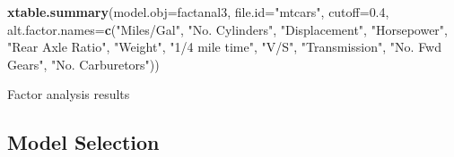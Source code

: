 \documentclass[]{article}
\newenvironment{Shaded}{\begin{snugshade}}{\end{snugshade}}
\newcommand{\KeywordTok}[1]{\textcolor[rgb]{0.13,0.29,0.53}{\textbf{{#1}}}}
\newcommand{\DataTypeTok}[1]{\textcolor[rgb]{0.13,0.29,0.53}{{#1}}}
\newcommand{\FloatTok}[1]{\textcolor[rgb]{0.00,0.00,0.81}{{#1}}}
\newcommand{\StringTok}[1]{\textcolor[rgb]{0.31,0.60,0.02}{{#1}}}
\newcommand{\NormalTok}[1]{{#1}}
\begin{document}
\begin{Shaded}
\begin{Highlighting}[]
\KeywordTok{xtable.summary}\NormalTok{(}\DataTypeTok{model.obj=}\NormalTok{factanal3, }
               \DataTypeTok{file.id=}\StringTok{"mtcars"}\NormalTok{, }
               \DataTypeTok{cutoff=}\FloatTok{0.4}\NormalTok{, }
               \DataTypeTok{alt.factor.names=}\KeywordTok{c}\NormalTok{(}\StringTok{"Miles/Gal"}\NormalTok{, }
                                  \StringTok{"No. Cylinders"}\NormalTok{, }
                                  \StringTok{"Displacement"}\NormalTok{, }
                                  \StringTok{"Horsepower"}\NormalTok{, }
                                  \StringTok{"Rear Axle Ratio"}\NormalTok{, }
                                  \StringTok{"Weight"}\NormalTok{, }
                                  \StringTok{"1/4 mile time"}\NormalTok{, }
                                  \StringTok{"V/S"}\NormalTok{, }
                                  \StringTok{"Transmission"}\NormalTok{, }
                                  \StringTok{"No. Fwd Gears"}\NormalTok{, }
                                  \StringTok{"No. Carburetors"}\NormalTok{))}
\end{Highlighting}
\end{Shaded}

\begin{table}[h!]
\captionsetup[subtable]{labelformat=empty}
\centering
\subfloat[]{\label{tab:mtcars_fa-a}{}}\quad
\subfloat[]{\label{tab:mtcars_fa-b}{}}\quad
\subfloat[]{\label{tab:mtcars_fa-c}{}}
\caption{Factor analysis results}
\label{tab:mtcars_fa}
\end{table}

\subsection{Model Selection}\label{model-selection}
\end{document}
